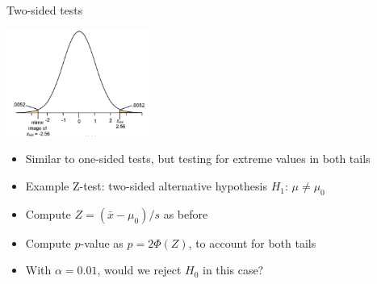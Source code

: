\begin{frame}[c]{Two-sided tests}


\vspace*{-0.2cm}
\begin{center}
\includegraphics[height=3.5cm]{images/z_test_3.png}
\end{center}
\vspace*{-0.2cm}

\begin{itemize}
  \item Similar to one-sided tests, but testing for extreme values in both tails
  \item Example Z-test: two-sided alternative hypothesis $H_1$:
  $\mu \neq \mu_0$
  \pause
  \smallskip
  \item Compute $Z = (\bar{x}-\mu_0)/s$ as before
  \item Compute $p$-value as $p = 2\Phi(Z)$, to account for both tails
 \pause 
\medskip
  \item With $\alpha = 0.01$, would we reject $H_0$ in this case? \hands
\end{itemize}

\end{frame}


